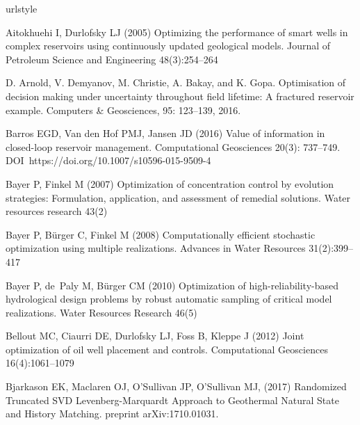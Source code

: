 \documentclass[11pt]{article}
\begin{document}
\begin{thebibliography}{51}
\providecommand{\natexlab}[1]{#1}
\providecommand{\url}[1]{{#1}}
\providecommand{\urlprefix}{URL }
\expandafter\ifx\csname urlstyle\endcsname\relax
  \providecommand{\doi}[1]{DOI~\discretionary{}{}{}#1}\else
  \providecommand{\doi}{DOI~\discretionary{}{}{}\begingroup
  \urlstyle{rm}\Url}\fi
\providecommand{\eprint}[2][]{\url{#2}}

Aitokhuehi I, Durlofsky LJ (2005) Optimizing the performance of smart wells in
  complex reservoirs using continuously updated geological models.
Journal of Petroleum Science and Engineering 48(3):254--264


D. Arnold, V. Demyanov, M. Christie, A. Bakay, and K. Gopa.
Optimisation of decision making under uncertainty throughout field lifetime: A fractured reservoir example.
Computers \& Geosciences, 95: 123--139,
  2016.

Barros EGD, Van den Hof PMJ, Jansen JD (2016) Value of information in closed-loop reservoir management.
Computational Geosciences 20(3): 737--749.
\doi{https://doi.org/10.1007/s10596-015-9509-4}

Bayer P, Finkel M (2007) Optimization of concentration control by evolution
  strategies: Formulation, application, and assessment of remedial solutions.
  Water resources research 43(2)

Bayer P, B{\"u}rger C, Finkel M (2008) Computationally efficient stochastic
  optimization using multiple realizations. Advances in Water Resources
  31(2):399--417

Bayer P, de~Paly M, B{\"u}rger CM (2010) Optimization of high-reliability-based
  hydrological design problems by robust automatic sampling of critical model
  realizations. Water Resources Research 46(5)

Bellout MC, Ciaurri DE, Durlofsky LJ, Foss B, Kleppe J (2012)
Joint optimization of oil well placement and controls.
Computational Geosciences 16(4):1061--1079


Bjarkason EK, Maclaren OJ, O'Sullivan JP, O'Sullivan MJ, (2017)
Randomized Truncated SVD Levenberg-Marquardt Approach to Geothermal Natural State and History Matching.
preprint arXiv:1710.01031.


\end{thebibliography}
\end{document}
